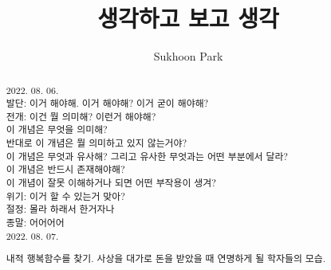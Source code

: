 \documentclass[11pt, a4paper]{article}
\begin{document}
\title{생각하고 보고 생각}
\author{Sukhoon Park}
\maketitle

\begin{abstract}

2022. 08. 06. \\
발단: 이거 해야해. 이거 해야해? 이거 굳이 해야해? \\
전개: 이건 뭘 의미해? 이런거 해야해? \\
이 개념은 무엇을 의미해? \\
반대로 이 개념은 뭘 의미하고 있지 않는거야? \\
이 개념은 무엇과 유사해? 그리고 유사한 무엇과는 어떤 부분에서 달라? \\
이 개념은 반드시 존재해야해? \\
이 개념이 잘못 이해하거나 되면 어떤 부작용이 생겨? \\
위기: 이거 할 수 있는거 맞아? \\
절정: 몰라 하래서 한거자나 \\
종말: 어어어어 \\

2022. 08. 07.

내적 행복함수를 찾기. 사상을 대가로 돈을 받았을 때 연명하게 될 학자들의 모습. \\


\end{abstract}

\newpage
\end{document}
